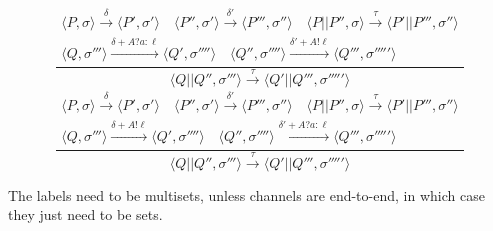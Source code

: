 \documentclass[times,10pt]{article}
\begin{document}
$$    \frac{\begin{matrix} \langle P, \sigma \rangle \xrightarrow{\delta} \langle P', \sigma' \rangle \quad \langle P'', \sigma' \rangle \xrightarrow{\delta'} \langle P''', \sigma'' \rangle \quad \langle P || P'', \sigma \rangle \xrightarrow{\tau} \langle P' || P''', \sigma'' \rangle \\ \langle Q, \sigma''' \rangle \xrightarrow{\delta + A?a : \ell} \langle Q', \sigma'''' \rangle \quad \langle Q'', \sigma'''' \rangle \xrightarrow{\delta' + A!\ell} \langle Q''', \sigma''''' \rangle \end{matrix}}{\langle Q || Q'', \sigma''' \rangle \xrightarrow{\tau} \langle Q' || Q''', \sigma''''' \rangle} $$$$
    \frac{\begin{matrix} \langle P, \sigma \rangle \xrightarrow{\delta} \langle P', \sigma' \rangle \quad \langle P'', \sigma' \rangle \xrightarrow{\delta'} \langle P''', \sigma'' \rangle \quad \langle P || P'', \sigma \rangle \xrightarrow{\tau} \langle P' || P''', \sigma'' \rangle \\ \langle Q, \sigma''' \rangle \xrightarrow{\delta + A!\ell} \langle Q', \sigma'''' \rangle \quad \langle Q'', \sigma'''' \rangle \xrightarrow{\delta' + A?a : \ell} \langle Q''', \sigma''''' \rangle \end{matrix}}{\langle Q || Q'', \sigma''' \rangle \xrightarrow{\tau} \langle Q' || Q''', \sigma''''' \rangle}
$$

The labels need to be multisets, unless channels are end-to-end, in which case they just need to be sets.
\end{document}
